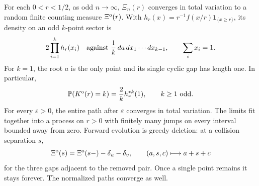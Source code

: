 \documentclass[11pt,letterpaper]{article}
\newcommand{\PP}{\mathbb P}\newcommand{\EE}{\mathbb E}
\newcommand{\ind}{\mathbf 1}\newcommand{\Exp}{\operatorname{Exp}}
\begin{document}
\begin{theorem}
\label{thm:odd-entrance}
For each $0<r<1/2$, as odd $n\to\infty$, $\Xi_n(r)$ converges in total
variation to a random finite counting measure $\Xi^{\rm o}(r)$.
With $h_r(x)=r^{-1}f(x/r)\ind_{\{x\ge r\}}$, its density on an odd
$k$-point sector is
\begin{equation}\label{eq:odd-sector}
 2\prod_{i=1}^k h_r(x_i)
 \quad\hbox{against }\frac1k\,da\,dx_1\cdots dx_{k-1},
 \qquad \sum_i x_i=1.
\end{equation}
For $k=1$, the root $a$ is the only point and its single cyclic gap has
length one. In particular,
\begin{equation}\label{eq:odd-count}
 \PP(K^{\rm o}(r)=k)=\frac2k h_r^{*k}(1),\qquad k\ge1\text{ odd}.
\end{equation}
For every $\varepsilon>0$, the entire path after $\varepsilon$ converges
in total variation. The limits fit together into a process on $r>0$
with finitely many jumps on every interval bounded away from zero.
Forward evolution is greedy deletion: at a collision separation $s$,
\begin{equation}\label{eq:counting-evolution}
 \Xi^{\rm o}(s)=\Xi^{\rm o}(s-)-\delta_u-\delta_v,
 \qquad (a,s,c)\longmapsto a+s+c
\end{equation}
for the three gaps adjacent to the removed pair. Once a single point
remains it stays forever. The normalized paths converge as well.
\end{theorem}
\end{document}
